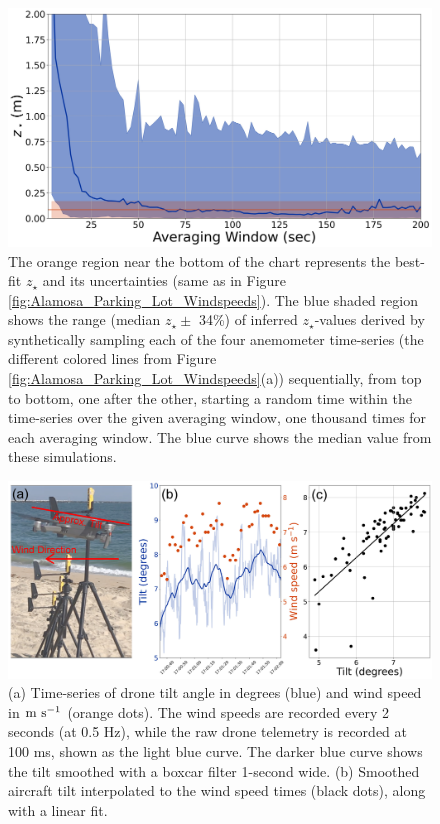 \documentclass[linenumbers]{aastex631}
\begin{document}
\begin{figure}
    \centering
    \includegraphics[width=\textwidth]{figures and data/synthetic_terrestrial_wind_profile.jpg}
    \caption{The orange region near the bottom of the chart represents the best-fit $z_\star$ and its uncertainties (same as in Figure \ref{fig:Alamosa_Parking_Lot_Windspeeds}). The blue shaded region shows the range (median $z_\star \pm$ 34\%) of inferred $z_\star$-values derived by synthetically sampling each of the four anemometer time-series (the different colored lines from Figure \ref{fig:Alamosa_Parking_Lot_Windspeeds}(a)) sequentially, from top to bottom, one after the other, starting a random time within the time-series over the given averaging window, one thousand times for each averaging window. The blue curve shows the median value from these simulations.}
    \label{fig:synthetic_terrestrial_wind_profile}
\end{figure}

\begin{figure}
    \centering
    \includegraphics[width=\textwidth]{figures and data/example_tilt_and_windspeed.jpg}
    \caption{(a) Time-series of drone tilt angle in degrees (blue) and wind speed in ${\rm m\ s^{-1}}$ (orange dots). The wind speeds are recorded every 2 seconds (at 0.5 Hz), while the raw drone telemetry is recorded at 100 ms, shown as the light blue curve. The darker blue curve shows the tilt smoothed with a boxcar filter 1-second wide. (b) Smoothed aircraft tilt interpolated to the wind speed times (black dots), along with a linear fit.}
    \label{fig:example_tilt_and_windspeed}
\end{figure}
\end{document}
